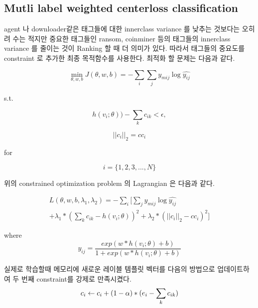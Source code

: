 \subsection{Mutli label weighted centerloss classification}
agent 나 downloader같은 태그들에 대한 innerclass variance 를 낮추는 것보다는 오히려 수는 적지만 중요한 태그들인 ransom, coinminer 등의 태그들의 innerclass variance 를 줄이는 것이 Ranking 할 때 더 의미가 있다. 따라서 태그들의 중요도를 constraint 로 추가한 최종 목적함수를 사용한다. 최적화 할 문제는 다음과 같다.  

\begin{equation}
\label{eqn:06}
\min_{\theta, w, b} J(\theta, w, b) = -\sum_i{ \sum_j{ y_{mij} \log{\hat{y_{ij}}}}}
\end{equation}

s.t.

\[
h(v_i;\theta)) - \sum_k{c_{ik}} < \epsilon ,
\]


\[
||c_i||_2 = cc_i
\]

for

\[
 i = \{1,2,3, ..., N\}
\]

위의 constrained optimization problem 의 Lagrangian 은 다음과 같다.

\begin{equation}
\label{eqn:07}
\begin{split}
L(\theta, w, b, \lambda_1, \lambda_2) = -\sum_i{[ \sum_j{ y_{mij} \log{\hat{y_{ij}}}}} \\  
+ \lambda_1 * (\sum_k{c_{ik}} - h(v_i;\theta))^2 + \lambda_2 * (||c_i||_2 - cc_i)^2 ]
\end{split}
\end{equation}

where 
\[
\hat{y_{ij}} = \frac{exp(w*h(v_i;\theta)+b)}{ 1 + exp(w*h(v_i;\theta)+b)}
\]

실제로 학습할때 메모리에 새로운 레이블 템플릿 벡터를 다음의 방법으로 업데이트하여 두 번째 constraint를 강제로 만족시켰다. 
\begin{equation}
\label{eqn:08}
c_i \leftarrow c_i + (1-\alpha) * (e_i - \sum_k{c_{ik}}) \\  
\end{equation}



